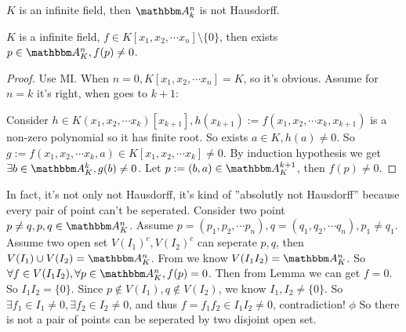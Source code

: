 \documentclass{ctexart}
\begin{document}
\begin{problem}
$K$ is an infinite field, then $\A_k^n$ is not Hausdorff.
\end{problem}
\begin{solution}
	\begin{lemma}
		\label{lem:2}
		$K$ is a infinite field, $f\in K[x_1,x_2,\cdots x_n]\setminus \{0\}$, then exists $p\in \A_K^n,f(p)\neq 0$.
	\end{lemma}
	\begin{proof}
		Use MI. When $n=0,K[x_1,x_2,\cdots x_n]=K$, so it's obvious. Assume for $n=k$ it's right, when goes to $k+1$:

		Consider $h\in K(x_1,x_2,\cdots x_k)[x_{k+1}],h(x_{k+1}):=f(x_1,x_2,\cdots x_k,x_{k+1})$ is a non-zero polynomial so it has finite root. So exists $a\in K,h(a)\neq 0$. So $g:=f(x_1,x_2,\cdots x_k,a)\in K[x_1,x_2,\cdots x_k]\neq 0$.
		By induction hypothesis we get $\exists b\in \A_K^k,g(b)\neq 0$. Let $p:=(b,a)\in \A_K^{k+1}$, then $f(p)\neq 0$.
	\end{proof}
	In fact, it's not only not Hausdorff, it's kind of ''absolutly not Hausdorff'' because every pair of point can't be seperated.
	Consider two point $p\neq q,p,q\in \A_K^n$.
	Assume $p=(p_1,p_2,\cdots p_n),q=(q_1,q_2,\cdots q_n),p_1\neq q_1$. Assume two open set $V(I_1)^c,V(I_2)^c$ can seperate $p,q$, then $V(I_1)\cup V(I_2)=\A_K^n$.
	From  we know $V(I_1I_2)=\A_K^n$. So $\forall f\in V(I_1I_2),\forall p\in \A_K^n,f(p)=0$.
	Then from Lemma we can get $f=0$. So $I_1I_2=\{0\}$.
	Since $p\notin V(I_1),q\notin V(I_2)$, we know $I_1,I_2\neq \{0\}$. So $\exists f_1\in I_1\neq 0,\exists f_2\in I_2\neq 0$, and thus $f=f_1f_2\in I_1I_2\neq 0$, contradiction!
	\(\phi\)
	So there is not a pair of points can be seperated by two disjoint open set.
\end{solution}
\end{document}
